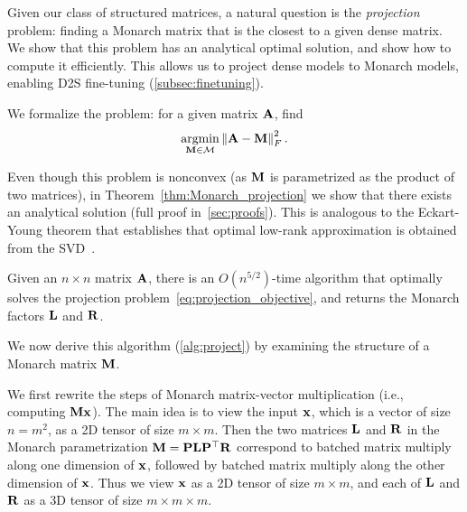 Given our class of structured matrices, a natural question is the
\emph{projection} problem: finding a Monarch matrix that is the closest to a
given dense matrix.
We show that this problem has an analytical optimal solution, and show how to compute it efficiently.
This allows us to project dense models to Monarch models, enabling D2S
fine-tuning (\cref{subsec:finetuning}).

We formalize the problem: for a given matrix $\mathbf{A}$, find
\begin{equation}
  \label{eq:projection_objective}
  \operatorname*{argmin}\limits_{\mathbf{M} \in \mathcal{M}} \left\|{\mathbf{A} - \mathbf{M}}\right\|^2_F.
\end{equation}

Even though this problem is nonconvex (as $\mathbf{M}$ is parametrized as the product of
two matrices), in Theorem~\ref{thm:Monarch_projection} we
show that there exists an analytical solution (full proof in~\cref{sec:proofs}).
This is analogous to the Eckart-Young theorem that establishes that
optimal low-rank approximation is obtained from the SVD~\citep{eckart1936approximation}.
\begin{theorem}\label{thm:Monarch_projection}
  Given an $n \times n$ matrix $\mathbf{A}$, there is an $O(n^{5/2})$-time algorithm
  that optimally solves the projection problem~\eqref{eq:projection_objective},
  and returns the Monarch factors $\mathbf{L}$ and $\mathbf{R}$.
\end{theorem}

We now derive this algorithm (\cref{alg:project}) by examining the structure of
a Monarch matrix $\mathbf{M}$.

We first rewrite the steps of Monarch matrix-vector multiplication (i.e., computing $\mathbf{M} \mathbf{x}$).
The main idea is to view the input $\mathbf{x}$, which is a vector of size $n = m^2$, as a 2D
tensor of size $m \times m$.
Then the two matrices $\mathbf{L}$ and $\mathbf{R}$ in the Monarch parametrization $\mathbf{M} = \mathbf{P}\mathbf{L}\mathbf{P}^\top \mathbf{R}$ correspond
to batched matrix multiply along one dimension of $\mathbf{x}$, followed by batched matrix
multiply along the other dimension of $\mathbf{x}$.
Thus we view $\mathbf{x}$ as a 2D tensor of size $m \times m$, and each of
$\mathbf{L}$ and $\mathbf{R}$ as a 3D tensor of size $m \times m \times m$.

